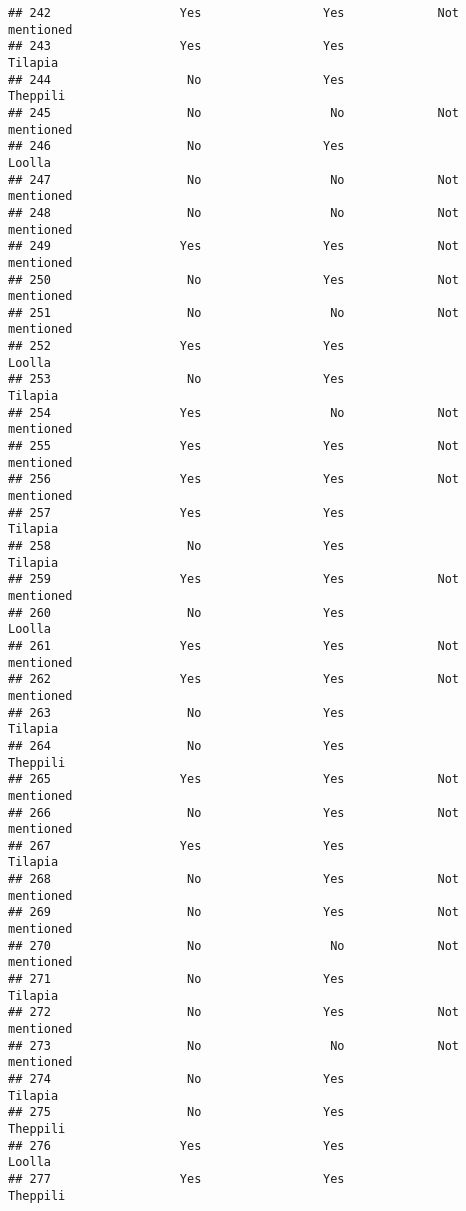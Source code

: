 \documentclass[
]{article}
\begin{document}
\begin{verbatim}
## 242                  Yes                 Yes             Not mentioned
## 243                  Yes                 Yes                  Tilapia 
## 244                   No                 Yes                 Theppili 
## 245                   No                  No             Not mentioned
## 246                   No                 Yes                   Loolla 
## 247                   No                  No             Not mentioned
## 248                   No                  No             Not mentioned
## 249                  Yes                 Yes             Not mentioned
## 250                   No                 Yes             Not mentioned
## 251                   No                  No             Not mentioned
## 252                  Yes                 Yes                   Loolla 
## 253                   No                 Yes                  Tilapia 
## 254                  Yes                  No             Not mentioned
## 255                  Yes                 Yes             Not mentioned
## 256                  Yes                 Yes             Not mentioned
## 257                  Yes                 Yes                  Tilapia 
## 258                   No                 Yes                  Tilapia 
## 259                  Yes                 Yes             Not mentioned
## 260                   No                 Yes                   Loolla 
## 261                  Yes                 Yes             Not mentioned
## 262                  Yes                 Yes             Not mentioned
## 263                   No                 Yes                  Tilapia 
## 264                   No                 Yes                 Theppili 
## 265                  Yes                 Yes             Not mentioned
## 266                   No                 Yes             Not mentioned
## 267                  Yes                 Yes                  Tilapia 
## 268                   No                 Yes             Not mentioned
## 269                   No                 Yes             Not mentioned
## 270                   No                  No             Not mentioned
## 271                   No                 Yes                  Tilapia 
## 272                   No                 Yes             Not mentioned
## 273                   No                  No             Not mentioned
## 274                   No                 Yes                  Tilapia 
## 275                   No                 Yes                 Theppili 
## 276                  Yes                 Yes                   Loolla 
## 277                  Yes                 Yes                 Theppili 

\end{verbatim}
\end{document}
